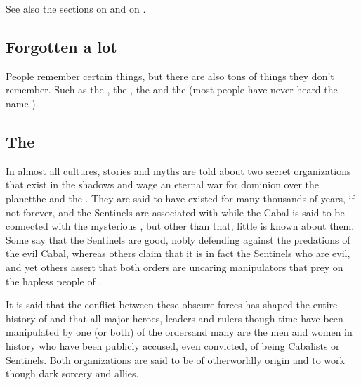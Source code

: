 See also the sections on  and on . 









\subsection{Forgotten a lot}
People remember certain things, but there are also tons of things they don't remember. 
Such as the \banes, the \resphain, the \dragons{} and the \xss{} (most people have never heard the name \quo{\xs}). 










\subsection{The \Feud}
In almost all \Miithian{} cultures, stories and myths are told about two secret organizations that exist in the shadows and wage an eternal war for dominion over the planet\dash{}the  and the . 
They are said to have existed for many thousands of years, if not forever, and the Sentinels are associated with \dragons{} while the Cabal is said to be connected with the mysterious \banes{}, but other than that, little is known about them. Some say that the Sentinels are good, nobly defending \Miith{} against the predations of the evil Cabal, whereas others claim that it is in fact the Sentinels who are evil, and yet others assert that both orders are uncaring manipulators that prey on the hapless people of \Miith{}. 

It is said that the conflict between these obscure forces has shaped the entire history of \Miith{} and that all major heroes, leaders and rulers though time have been manipulated by one (or both) of the orders\dash{}and many are the men and women in history who have been publicly accused, even convicted, of being Cabalists or Sentinels. Both organizations are said to be of otherworldly origin and to work though dark sorcery and \daemonic{} allies. 


